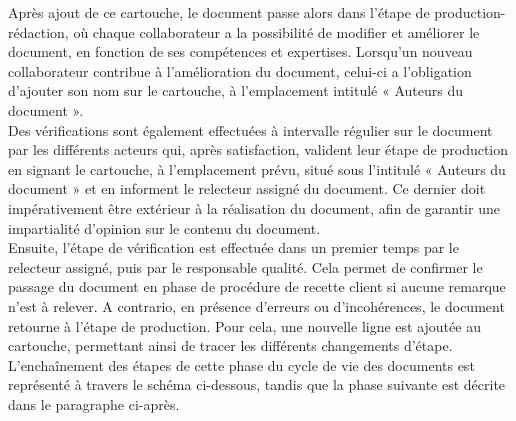 \begin{figure}[H]
\centering
{}
\end{figure}

Après ajout de ce cartouche, le document passe alors dans l’étape de production-rédaction, où chaque collaborateur a la possibilité de modifier et améliorer le document, en fonction de ses compétences et expertises. Lorsqu’un nouveau collaborateur contribue à l’amélioration du document, celui-ci a l’obligation d’ajouter son nom sur le cartouche, à l’emplacement intitulé « Auteurs du document ». \\
 
Des vérifications sont également effectuées à intervalle régulier sur le document par les différents acteurs qui, après satisfaction, valident leur étape de production en signant le cartouche, à l’emplacement prévu, situé sous l’intitulé « Auteurs du document » et en informent le relecteur assigné du document. Ce dernier doit impérativement être extérieur à la réalisation du document, afin de garantir une impartialité d’opinion sur le contenu du document. \\
 
Ensuite, l’étape de vérification est effectuée dans un premier temps par le relecteur assigné, puis par le responsable qualité. Cela permet de confirmer le passage du document en phase de procédure de recette client si aucune remarque n’est à relever. A contrario, en présence d’erreurs ou d’incohérences, le document retourne à l’étape de production. Pour cela, une nouvelle ligne est ajoutée au cartouche, permettant ainsi de tracer les différents changements d’étape. \\
 
L’enchaînement des étapes de cette phase du cycle de vie des documents est représenté à travers le schéma ci-dessous, tandis que la phase suivante est décrite dans le paragraphe ci-après. \\

